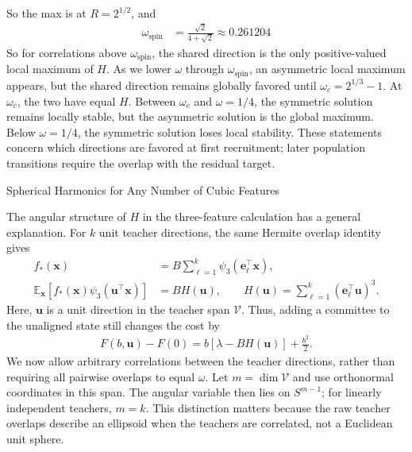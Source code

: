 \documentclass[11pt, reqno]{amsart}
\makeatletter
\def\section{\@startsection{section}{1}%
  \z@{.7\linespacing\@plus\linespacing}{.5\linespacing}%
  {\normalfont\scshape\centering}}
\theoremstyle{notestyle}
\theoremstyle{defstyle}
\makeatother
\begin{document}
So the max is at $R = 2^{1/2}$, and
\begin{align*}
    \omega_\text{spin}
    &= \frac{\sqrt{2}}{4+\sqrt{2}}
    \approx 0.261204
\end{align*}
So for correlations above $\omega_\text{spin}$, the shared direction is the only positive-valued local maximum of $H$.
As we lower $\omega$ through $\omega_\text{spin}$, an asymmetric local maximum appears, but the shared direction remains globally favored until $\omega_c = 2^{1/3}-1$.
At $\omega_c$, the two have equal $H$.
Between $\omega_c$ and $\omega = 1/4$, the symmetric solution remains locally stable, but the asymmetric solution is the global maximum.
Below $\omega = 1/4$, the symmetric solution loses local stability.
These statements concern which directions are favored at first recruitment; later population transitions require the overlap with the residual target.

\section{Spherical Harmonics for Any Number of Cubic Features}
\label{sec:cubic-spherical-harmonics}

The angular structure of $H$ in the three-feature calculation has a general explanation.
For $k$ unit teacher directions, the same Hermite overlap identity gives
\begin{align*}
    f_*(\mathbf x) &= B\sum_{\ell=1}^k \psi_3(\mathbf e_\ell^\top\mathbf x), \\
    \mathbb E_{\mathbf x}\left[f_*(\mathbf x)\psi_3(\mathbf u^\top\mathbf x)\right]
    &= B H(\mathbf u),
    \qquad H(\mathbf u) = \sum_{\ell=1}^k (\mathbf e_\ell^\top\mathbf u)^3.
\end{align*}
Here, $\mathbf u$ is a unit direction in the teacher span $\mathcal V$.
Thus, adding a committee to the unaligned state still changes the cost by
\begin{align*}
    F(b,\mathbf u)-F(0) = b[\lambda-BH(\mathbf u)]+\frac{b^2}{2}.
\end{align*}
We now allow arbitrary correlations between the teacher directions, rather than requiring all pairwise overlaps to equal $\omega$.
Let $m=\dim\mathcal V$ and use orthonormal coordinates in this span.
The angular variable then lies on $S^{m-1}$; for linearly independent teachers, $m=k$.
This distinction matters because the raw teacher overlaps describe an ellipsoid when the teachers are correlated, not a Euclidean unit sphere.
\end{document}
